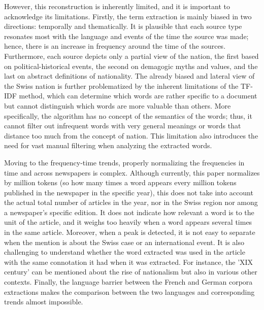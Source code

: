 \documentclass[11pt]{article}
\begin{document}
However, this reconstruction is inherently limited, and it is important to acknowledge its limitations. Firstly, the term extraction is mainly biased in two directions: temporally and thematically. It is plausible that each source type resonates most with the language and events of the time the source was made; hence, there is an increase in frequency around the time of the sources. Furthermore, each source depicts only a partial view of the nation, the first based on political-historical events, the second on demagogic myths and values, and the last on abstract definitions of nationality. The already biased and lateral view of the Swiss nation is further problematized by the inherent limitations of the TF-IDF method, which can determine which words are rather specific to a document but cannot distinguish which words are more valuable than others. More specifically, the algorithm has no concept of the semantics of the words; thus, it cannot filter out infrequent words with very general meanings or words that distance too much from the concept of nation. This limitation also introduces the need for vast manual filtering when analyzing the extracted words. \par
Moving to the frequency-time trends, properly normalizing the frequencies in time and across newspapers is complex. Although currently, this paper normalizes by million tokens (so how many times a word appears every million tokens published in the newspaper in the specific year), this does not take into account the actual total number of articles in the year, nor in the Swiss region nor among a newspaper's specific edition. It does not indicate how relevant a word is to the unit of the article, and it weighs too heavily when a word appears several times in the same article. Moreover, when a peak is detected, it is not easy to separate when the mention is about the Swiss case or an international event. It is also challenging to understand whether the word extracted was used in the article with the same connotation it had when it was extracted. For instance, the 'XIX century' can be mentioned about the rise of nationalism but also in various other contexts. Finally, the language barrier between the French and German corpora extractions makes the comparison between the two languages and corresponding trends almost impossible. \par
\end{document}
